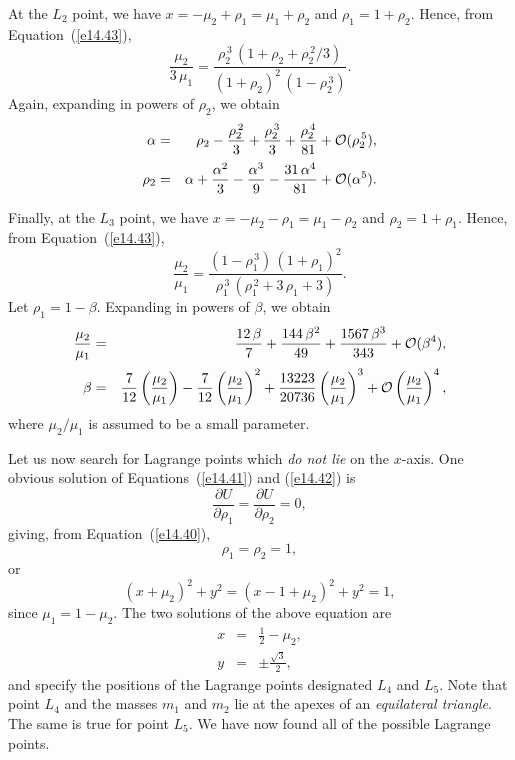 At the $L_2$ point,
we have $x = -\mu_2+\rho_1=\mu_1+\rho_2$ and $\rho_1=1+\rho_2$.
Hence, from Equation~(\ref{e14.43}),
\begin{equation}
\frac{\mu_2}{3\,\mu_1} = \frac{\rho_2^{\,3}\,(1+\rho_2+\rho_2^{\,2}/3)}{(1+\rho_2)^2\,(1-\rho_2^{\,3})}.
\end{equation}
Again, expanding in powers of $\rho_2$, we obtain
\begin{eqnarray}
\alpha &=& \rho_2 -\frac{\rho_2^{\,2}}{3} + \frac{\rho_2^{\,3}}{3} + \frac{\rho_2^{\,4}}{81}+ {\cal O}(\rho_2^{\,5}),\\[0.5ex]
\rho_2 &=& \alpha + \frac{\alpha^2}{3} - \frac{\alpha^3}{9} -\frac{31\,\alpha^4}{81}+{\cal O}(\alpha^5).
\end{eqnarray}

Finally, at the $L_3$ point,
we have $x = -\mu_2-\rho_1=\mu_1-\rho_2$ and $\rho_2=1+\rho_1$. Hence, from Equation~(\ref{e14.43}),
\begin{equation}
\frac{\mu_2}{\mu_1} = \frac{(1-\rho_1^{\,3})\,(1+\rho_1)^2}{\rho_1^{\,3}\,(\rho_1^{\,2}+3\,\rho_1+3)}.
\end{equation}
Let $\rho_1=1-\beta$. Expanding in powers of $\beta$, we obtain
\begin{eqnarray}
\frac{\mu_2}{\mu_1} &=&  \frac{12\,\beta}{7} + \frac{144\,\beta^2}{49} + \frac{1567\,\beta^3}{343} + {\cal O}(\beta^4),\\[0.5ex]
\beta &=&  \frac{7}{12}\left(\frac{\mu_2}{\mu_1}\right) - \frac{7}{12}\left(\frac{\mu_2}{\mu_1}\right)^2
+\frac{13223}{20736}\left(\frac{\mu_2}{\mu_1}\right)^3 + {\cal O}\left(\frac{\mu_2}{\mu_1}\right)^4,
\end{eqnarray}
where $\mu_2/\mu_1$ is assumed to be a small parameter.

Let us now search for Lagrange points which {\em do not lie}\/ on the $x$-axis. One obvious solution of Equations~(\ref{e14.41})
and (\ref{e14.42}) is 
\begin{equation}
\frac{\partial U}{\partial \rho_1} = \frac{\partial U}{\partial \rho_2} = 0,
\end{equation}
giving, from Equation~(\ref{e14.40}),
\begin{equation}
\rho_1 = \rho_2 =1,
\end{equation}
or
\begin{equation}
(x+\mu_2)^2 + y^2 = (x-1+\mu_2)^2 + y^2 = 1,
\end{equation}
since $\mu_1=1-\mu_2$.
The two solutions of the above equation are
\begin{eqnarray}
x &=& \frac{1}{2}-\mu_2,\\[0.5ex]
y &=& \pm \frac{\sqrt{3}}{2},
\end{eqnarray}
and specify the positions of the Lagrange points designated $L_4$ and $L_5$. Note that  point $L_4$ and the masses
$m_1$ and $m_2$ lie at the apexes of an {\em equilateral triangle}. The same is
true for   point $L_5$. We have now found all of the possible Lagrange points.

